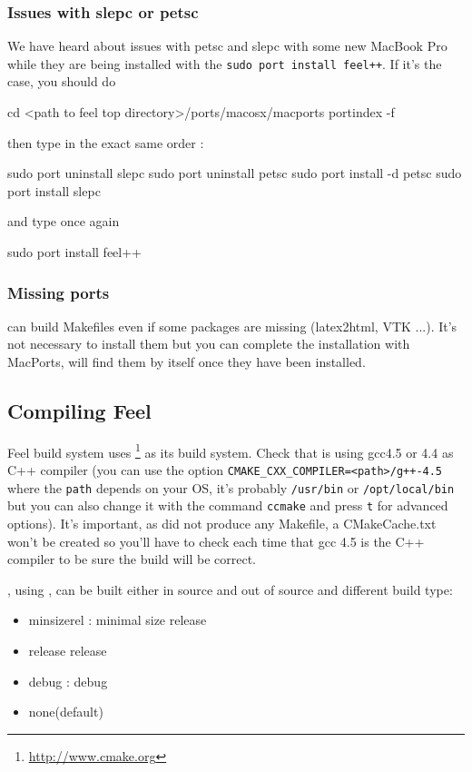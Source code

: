 \subsubsection{Issues with slepc or petsc}
We have heard about issues with petsc and slepc with some new MacBook Pro while they are being installed with the \verb|sudo port install feel++|. If it's the case, you should do 
\begin{unixcom}
		cd <path to feel top directory>/ports/macosx/macports
		portindex -f
\end{unixcom}

then type in the exact same order :
\begin{unixcom}
		sudo port uninstall slepc 
		sudo port uninstall petsc
		sudo port install -d petsc
		sudo port install slepc
\end{unixcom}
and type once again
\begin{unixcom}
		sudo port install feel++
\end{unixcom}

\subsubsection{Missing ports}
\cmake can build Makefiles even if some packages are missing (latex2html, VTK ...). It's not necessary to install them but you can complete the installation with MacPorts, \cmake will find them by itself once they have been installed.

\subsection{Compiling Feel}
\label{compilingfeel}
Feel build system uses \cmake{}\footnote{\url{http://www.cmake.org}}
as its build system. Check that \cmake is using gcc4.5 or 4.4 as C++ compiler
(you can use the option \verb|CMAKE_CXX_COMPILER=<path>/g++-4.5| where the
\verb|path| depends on your OS, it's probably \verb|/usr/bin| or
\verb|/opt/local/bin| but you can also change it with the command \verb|ccmake|
and press \verb|t| for advanced options). \newline It's important, as \cmake did
not produce any Makefile, a CMakeCache.txt won't be created so you'll have to
check each time that gcc 4.5 is the C++ compiler to be sure the build will be
correct.\newline

\feel, using \cmake, can be built either in source and out of source and different
build type:
\begin{itemize}
\item minsizerel : minimal size release
\item release release
\item debug : debug
\item none(default)
\end{itemize}

